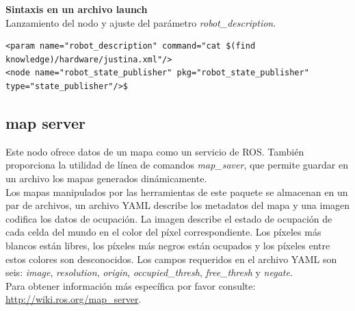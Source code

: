 \documentclass[user_manual.tex]{subfiles}
\begin{document}
\textbf{Sintaxis en un archivo launch}\\
Lanzamiento del nodo y ajuste del parámetro \textit{robot\_description}.
\begin{verbatim}
<param name="robot_description" command="cat $(find knowledge)/hardware/justina.xml"/>
<node name="robot_state_publisher" pkg="robot_state_publisher" type="state_publisher"/>$
\end{verbatim}

\subsection{map server}
Este nodo ofrece datos de un mapa como un servicio de ROS. También proporciona la utilidad de línea de comandos \textit{map\_saver}, que permite guardar en un archivo los mapas generados dinámicamente.\\

Los mapas manipulados por las herramientas de este paquete se almacenan en un par de archivos, un archivo YAML describe los metadatos del mapa y una imagen codifica los datos de ocupación. La imagen describe el estado de ocupación de cada celda del mundo en el color del píxel correspondiente. Los píxeles más blancos están libres, los píxeles más negros están ocupados y los píxeles entre estos colores son desconocidos. Los campos requeridos en el archivo YAML son seis: \textit{image}, \textit{resolution}, \textit{origin}, \textit{occupied\_thresh}, \textit{free\_thresh} y \textit{negate}. \\

Para obtener información más específica por favor consulte: \url{http://wiki.ros.org/map_server}.\\
\end{document}
